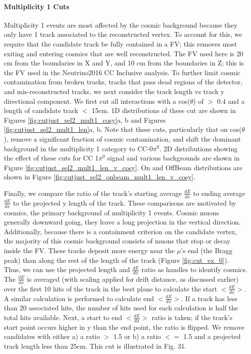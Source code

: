 \paragraph{Multiplicity 1 Cuts}
Multiplicity 1 events are most affected by the cosmic background because they only have 1 track associated to the reconstructed vertex. To account for this, we require that the candidate track be fully contained in a FV; this removes most exiting and entering cosmics that are well reconstructed. The FV used here is 20 cm from the boundaries in X and Y, and 10 cm from the boundaries in Z; this is the FV used in the Neutrino2016 CC Inclusive analysis. To further limit cosmic contamination from broken tracks, tracks that pass dead regions of the detector, and mis-reconstructed tracks, we next consider the track length vs track y directional component. We first cut all interactions with a cos($\theta$) of $>$ 0.4 and a length of candidate track $<$ 15cm. 1D distributions of these cut are shown in Figures \ref{fig:cutjust_sel2_mult1_cosy}a, b and Figures \ref{fig:cutjust_sel2_mult1_len}a, b. Note that these cuts, particularly that on cos($\theta$), remove a significant fraction of cosmic contamination, and shift the dominant background in the multiplicity 1 category to CC-0$\pi^0$. 2D distributions showing the effect of these cuts for CC 1$\pi^0$ signal and various backgrounds are shown in Figure \ref{fig:cutjust_sel2_mult1_len_v_cosy}. On and OffBeam distributions are shown in Figure \ref{fig:cutjust_sel2_onbeam_mult1_len_v_cosy}. 
\par Finally, we compare the ratio of the track's starting average $\frac{dE}{dx}$ to ending average $\frac{dE}{dx}$ to the projected y length of the track. These comparisons are motivated by cosmics, the primary background of multiplicity 1 events. Cosmic muons generally downward going, they leave a long projection in the vertical direction. Additionally, because there is a containment criterion on the candidate vertex, the majority of this cosmic background consists of muons that stop or decay inside the FV. These tracks deposit more energy near the $\mu$'s end (the Bragg peak) than along the rest of the length of the track (Figure \ref{fig:cut_ex_0}). Thus, we can use the projected length and $\frac{dE}{dx}$ ratio as handles to identify cosmics. The $\frac{dE}{dx}$ is averaged (with scaling applied for drift distance, as discussed earlier) over the first 10 hits of the track in the best plane to calculate the start $<\frac{dE}{dx}>$. A similar calculation is performed to calculate end $<\frac{dE}{dx}>$.  If a track has less than 20 associated hits, the number of hits used for each calculation is half the total hits available.  Next, a start to end $<\frac{dE}{dx}>$ ratio is taken; if the track's start point occurs higher in y than the end point, the ratio is flipped. We remove candidates with either a) a ratio $>$ 1.5 or b) a ratio $<=$ 1.5 and a projected track length less than 25cm.  This cut is illustrated in Fig. 31.

